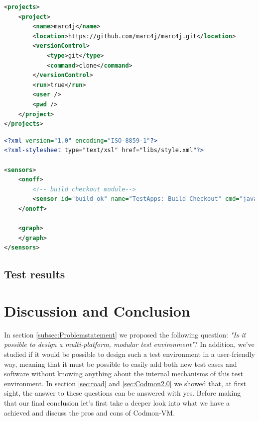 \documentclass{article}
\newcommand{\project}{Codmon-VM}
\begin{document}
\begin{lstlisting}[frame=shadowbox, language=XML,showstringspaces=false]
 <projects>
	<project>
		<name>marc4j</name>
		<location>https://github.com/marc4j/marc4j.git</location>
		<versionControl>
			<type>git</type>
			<command>clone</command>
		</versionControl>
		<run>true</run>
		<user />
		<pwd />
	</project>
</projects>
\end{lstlisting} 

\begin{lstlisting}[frame=shadowbox, language=XML,showstringspaces=false]
<?xml version="1.0" encoding="ISO-8859-1"?>
<?xml-stylesheet type="text/xsl" href="libs/style.xml"?>

<sensors>
	<onoff>
		<!-- build checkout module-->
		<sensor id="build_ok" name="TestApps: Build Checkout" cmd="java CODMON_HOME/codmon/wrappers/classes/TimeWrapper ../../local/checkoutApplications run" scope="checkOut" scheduled="false" graph="true" fatal="true" />
	</onoff>

	<graph>
	</graph>
</sensors>
\end{lstlisting}

\subsection{Test results}
\label{test:results}


\newpage
\section{Discussion and Conclusion}
\label{sec:evaluation}
In section \ref{subsec:Problemstatement} we proposed the following question: \emph{"Is it possible to design a multi-platform, modular test environment"}? In addition, we've studied if it would be 
possible to design such a test environment in a user-friendly way, meaning that it must be possible to easily add both new test cases and software without knowing anything about the internal mechanisms of this test environment. 
In section \ref{sec:road} and \ref{sec:Codmon2.0} we showed that, at first sight, the answer to these questions can be answered with yes. Before making that our final conclusion let's first take a deeper look 
into what we have a achieved and discuss the pros and cons of \project{}. \\
\end{document}
